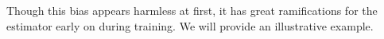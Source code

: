 \documentclass{article}
\begin{document}

Though this bias appears harmless at first, it has great ramifications for the
estimator early on during training. We will provide an illustrative example.
\end{document}

